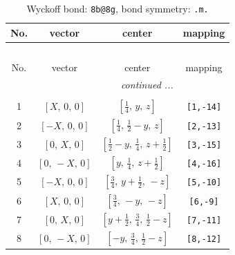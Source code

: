 \documentclass[fleqn,8pt]{jsarticle}
\begin{document}
\begin{longtable}{cccc}
\caption{Wyckoff bond: {\tt 8b@8g}, bond symmetry: {\tt .m.}}
 \\
 \hline \hline
No. & vector & center & mapping \\ \hline \endfirsthead

\multicolumn{3}{l}{\tablename\ \thetable{}} \\
 \hline \hline
No. & vector & center & mapping \\ \hline \endhead

 \hline \hline
\multicolumn{3}{r}{\footnotesize\it continued ...} \\ \endfoot

 \hline \hline
\multicolumn{3}{r}{} \\ \endlastfoot

1 & $\left[ X,\, 0,\, 0 \right]$ & $\left[ \frac{1}{4},\, y,\, z \right]$ & {\tt [1,-14]} \\ \hline
2 & $\left[ - X,\, 0,\, 0 \right]$ & $\left[ \frac{1}{4},\, \frac{1}{2} - y,\, z \right]$ & {\tt [2,-13]} \\ \hline
3 & $\left[ 0,\, X,\, 0 \right]$ & $\left[ \frac{1}{2} - y,\, \frac{1}{4},\, z + \frac{1}{2} \right]$ & {\tt [3,-15]} \\ \hline
4 & $\left[ 0,\, - X,\, 0 \right]$ & $\left[ y,\, \frac{1}{4},\, z + \frac{1}{2} \right]$ & {\tt [4,-16]} \\ \hline
5 & $\left[ - X,\, 0,\, 0 \right]$ & $\left[ \frac{3}{4},\, y + \frac{1}{2},\, - z \right]$ & {\tt [5,-10]} \\ \hline
6 & $\left[ X,\, 0,\, 0 \right]$ & $\left[ \frac{3}{4},\, - y,\, - z \right]$ & {\tt [6,-9]} \\ \hline
7 & $\left[ 0,\, X,\, 0 \right]$ & $\left[ y + \frac{1}{2},\, \frac{3}{4},\, \frac{1}{2} - z \right]$ & {\tt [7,-11]} \\ \hline
8 & $\left[ 0,\, - X,\, 0 \right]$ & $\left[ - y,\, \frac{3}{4},\, \frac{1}{2} - z \right]$ & {\tt [8,-12]} \\
\end{longtable}
\renewcommand{\arraystretch}{1.2}
\end{document}
